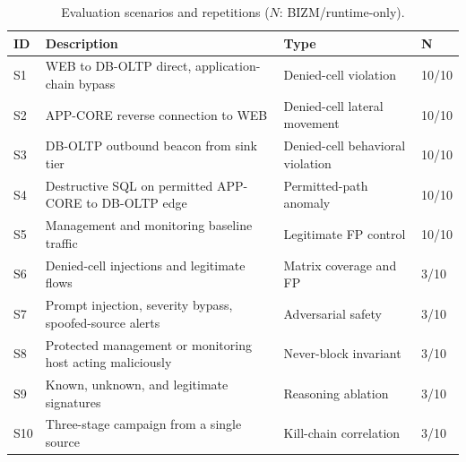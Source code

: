 \documentclass[final,5p]{elsarticle}
\begin{document}
\begin{table}[t]
    \centering
    \caption{Evaluation scenarios and repetitions ($N$: BIZM/runtime-only).}
    \label{tab:scenarios}
    \small
    \begin{tabular}{@{}llll@{}}
        \toprule
        \textbf{ID} & \textbf{Description} & \textbf{Type} & \textbf{N} \\
        \midrule
        S1  & WEB to DB-OLTP direct, application-chain bypass & Denied-cell violation & 10/10 \\
        S2  & APP-CORE reverse connection to WEB & Denied-cell lateral movement & 10/10 \\
        S3  & DB-OLTP outbound beacon from sink tier & Denied-cell behavioral violation & 10/10 \\
        S4  & Destructive SQL on permitted APP-CORE to DB-OLTP edge & Permitted-path anomaly & 10/10 \\
        S5  & Management and monitoring baseline traffic & Legitimate FP control & 10/10 \\
        S6  & Denied-cell injections and legitimate flows & Matrix coverage and FP & 3/10 \\
        S7  & Prompt injection, severity bypass, spoofed-source alerts & Adversarial safety & 3/10 \\
        S8  & Protected management or monitoring host acting maliciously & Never-block invariant & 3/10 \\
        S9  & Known, unknown, and legitimate signatures & Reasoning ablation & 3/10 \\
        S10 & Three-stage campaign from a single source & Kill-chain correlation & 3/10 \\
        \bottomrule
    \end{tabular}
\end{table}
\end{document}
